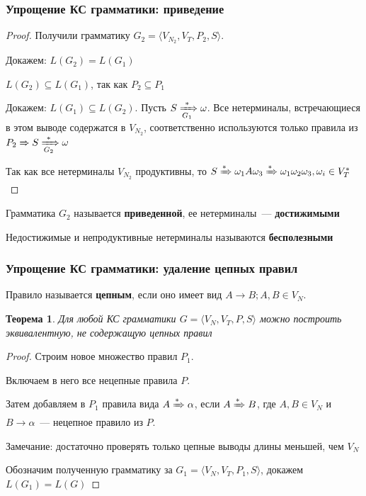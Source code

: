 \documentclass{beamer}
\newtheorem{rutheorem}{Теорема}
\newcommand{\derives}[1][*]{\xRightarrow[]{#1}}
\newcommand{\deriveg}[1]{\xRightarrow[#1]{*}}
\begin{document}
\begin{frame}[fragile]
  \transwipe[direction=90]
  \frametitle{Упрощение КС грамматики: приведение}
   \begin{proof}
   Получили грамматику $G_2 = \langle V_{N_2}, V_T, P_2, S\rangle$. 

   Докажем: $L(G_2) = L(G_1)$
   
   $L(G_2) \subseteq L(G_1)$, так как $P_2 \subseteq P_1$
   
   Докажем: $L(G_1) \subseteq L(G_2)$. Пусть $S \deriveg{G_1} \omega$. Все нетерминалы, встречающиеся в этом выводе содержатся в $V_{N_2}$, соответственно используются только правила из $ P_2 \derives[] S \deriveg{G_2} \omega $
   
   Так как все нетерминалы $V_{N_2}$ продуктивны, то  $S \derives \omega_1 A \omega_3 \derives \omega_1 \omega_2 \omega_3, \omega_i \in V_T^*$
   
   
   \end{proof}
   
   Грамматика $G_2$ называется \textbf{приведенной}, ее нетерминалы~--- \textbf{достижимыми}
   
   Недостижимые и непродуктивные нетерминалы называются \textbf{бесполезными}
\end{frame}

\begin{frame}[fragile]
  \transwipe[direction=90]
  \frametitle{Упрощение КС грамматики: удаление цепных правил}
  Правило называется \textbf{цепным}, если оно имеет вид $A \to B; A, B \in V_N$.
  
  \begin{rutheorem}
    Для любой КС грамматики $G=\langle V_N, V_T, P, S \rangle$ можно построить эквивалентную, не содержащую цепных правил
  \end{rutheorem}
  
   \begin{proof}
   Строим новое множество правил $P_1$. 
   
   Включаем в него все нецепные правила  $P$. 
   
   Затем добавляем в $P_1$ правила вида $A \derives \alpha$, если $A \derives B$, где $A, B \in V_N$ и $B \to \alpha$~--- нецепное правило из $P$.
   
   Замечание: достаточно проверять только цепные выводы длины меньшей, чем $V_N$
   
   Обозначим полученную грамматику за $G_1=\langle V_N, V_T, P_1, S \rangle$, докажем $L(G_1)=L(G)$
      \end{proof}
\end{frame} 
   
\end{document}
